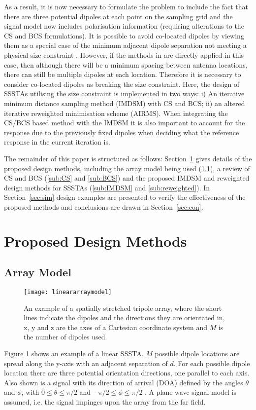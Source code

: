 \documentclass[10pt,final]{IEEEtran}
\begin{document}
As a result, it is now necessary to formulate the problem to include the fact that there are three potential dipoles at
each point on the sampling grid and the signal model now includes polarisation information (requiring
alterations to the CS and BCS formulations).  It is possible to avoid co-located dipoles by viewing them
as a special case of the minimum adjacent dipole separation not meeting a physical size constraint
\cite{Hawes14c}.  However, if the methods in \cite{Hawes14c} are directly applied in this case, then although
there will be a minimum spacing between antenna locations, there can still be multiple dipoles at each
location.  Therefore it is necessary to consider co-located dipoles as breaking the size constraint.
Here, the design of SSSTAs utilising the size constraint is implemented in two ways: i) An iterative minimum
distance sampling method (IMDSM) with CS and BCS; ii) an altered iterative reweighted minimisation scheme
(AIRMS).  When integrating the CS/BCS based method with the IMDSM it is also important to account for the
response due to the previously fixed dipoles when deciding what the reference response in the current
iteration is.

The remainder of this paper is structured as follows:
Section~\ref{sec:design} gives details of the proposed design methods, including the array model being used (\ref{sub:AM}), a review of CS and BCS (\ref{sub:CS} and \ref{sub:BCS}) and the proposed IMDSM and reweighted design methods for SSSTAs (\ref{sub:IMDSM} and \ref{sub:reweighted}).
In Section~\ref{sec:sim} design examples are presented to verify the effectiveness of the proposed methods and conclusions are
drawn in Section~\ref{sec:con}.

\section{Proposed Design Methods}\label{sec:design}
\subsection{Array Model}\label{sub:AM}
\begin{figure}[htb]
\begin{center}
   \texttt{[image: lineararraymodel]}
   \caption{An example of a spatially stretched tripole array, where the short lines indicate the dipoles and the directions they are orientated in, x, y and z are the axes of a Cartesian coordinate system and $M$ is the number of dipoles used.
    \label{fig:AM}}
\end{center}
\end{figure}
Figure \ref{fig:AM} shows an example of a linear SSSTA.  $M$ possible dipole locations are spread along the y-axis with an adjacent separation of $d$.  For each possible dipole location there are three potential orientation directions, one parallel to each axis.  Also shown is a signal with its direction of
arrival (DOA) defined by the angles $\theta$ and $\phi$, with $0\leq\theta\leq\pi/2$ and $-\pi/2\leq\phi\leq\pi/2$ \cite{Compton81b,Liu13a}.  A
plane-wave signal model is assumed, i.e. the signal impinges upon
the array from the far field.
\end{document}
